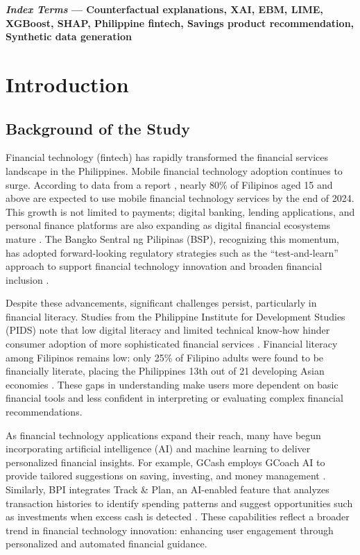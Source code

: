 \documentclass[journal]{./IEEE/IEEEtran}
\begin{document}
\begin{IEEEkeywords}
    \textbf{\textit{Index Terms} --- Counterfactual explanations, XAI, EBM, LIME, XGBoost, SHAP, Philippine fintech, Savings product recommendation, Synthetic data generation}
\end{IEEEkeywords}


\section{Introduction}

\subsection{Background of the Study}

Financial technology (fintech) has rapidly transformed the financial services landscape in the Philippines. Mobile financial technology adoption continues to surge. According to data from a report \cite{ref1}, nearly 80\% of Filipinos aged 15 and above are expected to use mobile financial technology services by the end of 2024. This growth is not limited to payments; digital banking, lending applications, and personal finance platforms are also expanding as digital financial ecosystems mature \cite{ref2}. The Bangko Sentral ng Pilipinas (BSP), recognizing this momentum, has adopted forward-looking regulatory strategies such as the ``test-and-learn'' approach to support financial technology innovation and broaden financial inclusion \cite{ref3}.

Despite these advancements, significant challenges persist, particularly in financial literacy. Studies from the Philippine Institute for Development Studies (PIDS) note that low digital literacy and limited technical know-how hinder consumer adoption of more sophisticated financial services \cite{ref4}. Financial literacy among Filipinos remains low: only 25\% of Filipino adults were found to be financially literate, placing the Philippines 13th out of 21 developing Asian economies \cite{ref5}. These gaps in understanding make users more dependent on basic financial tools and less confident in interpreting or evaluating complex financial recommendations.

As financial technology applications expand their reach, many have begun incorporating artificial intelligence (AI) and machine learning to deliver personalized financial insights. For example, GCash employs GCoach AI to provide tailored suggestions on saving, investing, and money management \cite{ref6}. Similarly, BPI integrates Track \& Plan, an AI-enabled feature that analyzes transaction histories to identify spending patterns and suggest opportunities such as investments when excess cash is detected \cite{ref7}. These capabilities reflect a broader trend in financial technology innovation: enhancing user engagement through personalized and automated financial guidance.
\end{document}
